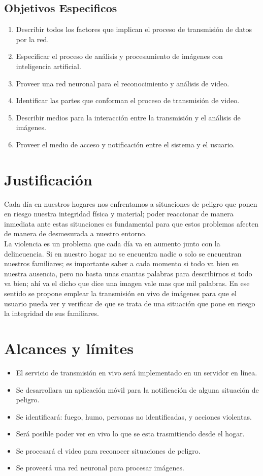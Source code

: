 \subsection{Objetivos Especificos}
\begin{enumerate}
    \item Describir todos los factores que implican el proceso de transmisión de datos por la red.
    \item Especificar el proceso de análisis y procesamiento de imágenes con inteligencia artificial.
    \item Proveer una red neuronal para el reconocimiento y análisis de video.
    \item Identificar las partes que conforman el proceso de transmisión de video.
    \item Describir medios para la interacción entre la transmisión y el análisis de imágenes.
    \item Proveer el medio de acceso y notificación entre el sistema y el usuario.
\end{enumerate}

\section{Justificación}
Cada día en nuestros hogares nos enfrentamos a situaciones de peligro que ponen en riesgo nuestra integridad física y material; poder reaccionar de manera inmediata ante estas situaciones es fundamental para que estos problemas afecten de manera de desmesurada a nuestro entorno.\\

La violencia es un problema que cada día va en aumento junto con la delincuencia. Si en nuestro hogar no se encuentra nadie o solo se encuentran nuestros familiares; es importante saber a cada momento si todo va bien en nuestra ausencia, pero no basta unas cuantas palabras para describirnos 
si todo va bien; ahí va el dicho que dice una imagen vale mas que mil palabras. En ese sentido se propone emplear la transmisión en vivo de imágenes para que el usuario pueda ver y verificar de que se trata de una situación que pone en riesgo la integridad de sus familiares.

\section{Alcances y límites}
\begin{itemize}
    \item El servicio de transmisión en vivo será implementado en un servidor en línea.
    \item Se desarrollara un aplicación móvil para la notificación de alguna situación de peligro.
    \item Se identificará: fuego, humo, personas no identificadas, y acciones violentas.
    \item Será posible poder ver en vivo lo que se esta trasmitiendo desde el hogar.
    \item Se procesará el video para reconocer situaciones de peligro.
    \item Se proveerá una red neuronal para procesar imágenes.
\end{itemize}

